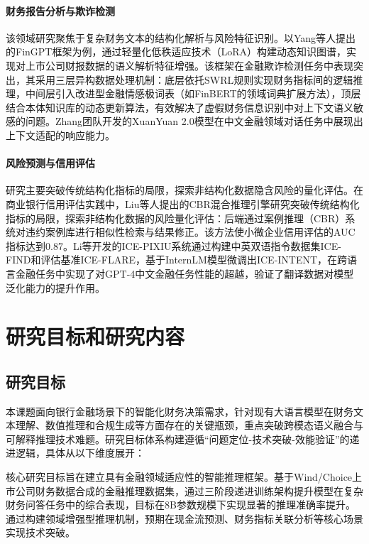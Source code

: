 \documentclass[professional,privacy,print,win,long,STEM,AutoFakeBold]{def/buaa}
\begin{document}
\paragraph{财务报告分析与欺诈检测}

该领域研究聚焦于复杂财务文本的结构化解析与风险特征识别。以Yang等人提出的FinGPT框架为例，通过轻量化低秩适应技术（LoRA）构建动态知识图谱，实现对上市公司财报数据的语义解析特征增强。该框架在金融欺诈检测任务中表现突出，其采用三层异构数据处理机制：底层依托SWRL规则实现财务指标间的逻辑推理，中间层引入改进型金融情感极词表（如FinBERT的领域词典扩展方法），顶层结合本体知识库的动态更新算法，有效解决了虚假财务信息识别中对上下文语义敏感的问题。Zhang团队开发的XuanYuan 2.0模型在中文金融领域对话任务中展现出上下文适配的响应能力。

\paragraph{风险预测与信用评估}

研究主要突破传统结构化指标的局限，探索非结构化数据隐含风险的量化评估。在商业银行信用评估实践中，Liu等人提出的CBR混合推理引擎研究突破传统结构化指标的局限，探索非结构化数据的风险量化评估：后端通过案例推理（CBR）系统对违约案例库进行相似性检索与结果修正。该方法使小微企业信用评估的AUC指标达到0.87。Li等开发的ICE-PIXIU系统通过构建中英双语指令数据集ICE-FIND和评估基准ICE-FLARE，基于InternLM模型微调出ICE-INTENT，在跨语言金融任务中实现了对GPT-4中文金融任务性能的超越，验证了翻译数据对模型泛化能力的提升作用。

\section{研究目标和研究内容}

\subsection{研究目标}

本课题面向银行金融场景下的智能化财务决策需求，针对现有大语言模型在财务文本理解、数值推理和合规生成等方面存在的关键瓶颈，重点突破跨模态语义融合与可解释推理技术难题。研究目标体系构建遵循“问题定位-技术突破-效能验证”的递进逻辑，具体从以下维度展开：

核心研究目标旨在建立具有金融领域适应性的智能推理框架。基于Wind/Choice上市公司财务数据合成的金融推理数据集，通过三阶段递进训练架构提升模型在复杂财务问答任务中的综合表现，目标在8B参数规模下实现显著的推理准确率提升。通过构建领域增强型推理机制，预期在现金流预测、财务指标关联分析等核心场景实现技术突破。
\end{document}
